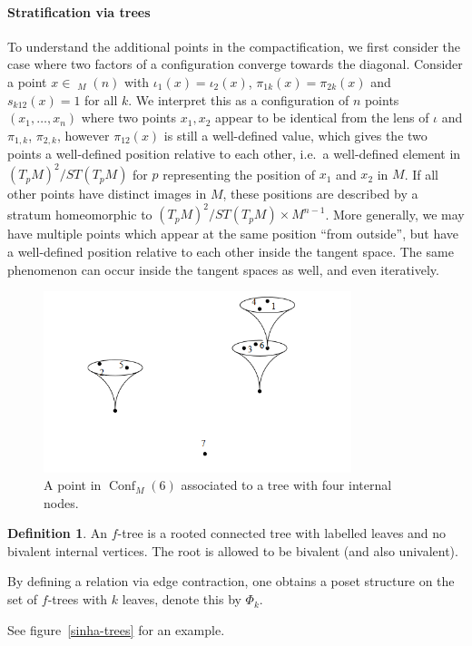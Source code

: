 \documentclass{scrartcl}
\theoremstyle{plain}
\theoremstyle{definition}
\newtheorem{definition}[theorem]{Definition}
\DeclareMathOperator{\Conf}{Conf}
\DeclareMathOperator{\cConf}{\overline{Conf}}
\begin{document}
\paragraph{Stratification via trees} To understand the additional points in the compactification, we first consider the case where two factors of a configuration converge towards the diagonal. Consider a point $x\in \cConf_M(n)$ with $\iota_1(x) = \iota_2(x)$, $\pi_{1k}(x) = \pi_{2k}(x)$ and $s_{k12}(x) = 1$ for all $k$. We interpret this as a configuration of $n$ points $(x_1, \dots, x_n)$ where two points $x_1, x_2$ appear to be identical from the lens of $\iota$ and $\pi_{1,k}$, $\pi_{2,k}$, however $\pi_{12}(x)$ is still a well-defined value, which gives the two points a well-defined position relative to each other, i.e.\ a well-defined element in $(T_{p}M)^2/ST(T_{p}M)$ for $p$ representing the position of $x_1$ and $x_2$ in $M$. If all other points have distinct images in $M$, these positions are described by a stratum homeomorphic to $(T_{p}M)^2/ST(T_{p}M) \times M^{n-1}$. More generally, we may have multiple points which appear at the same position ``from outside'', but have a well-defined position relative to each other inside the tangent space. The same phenomenon can occur inside the tangent spaces as well, and even iteratively. 

\begin{figure}[ht]\label{sinha-fm}
    \centering
    \includegraphics[width=0.8\textwidth]{img/sinha-fm-element}
    \caption{A point in $\Conf_M(6)$ associated to a tree with four internal nodes. }
\end{figure}    

\begin{definition}
    An $f$-tree is a rooted connected tree with labelled leaves and no bivalent internal vertices. The root is allowed to be bivalent (and also univalent).
    
    By defining a relation via edge contraction, one obtains a poset structure on the set of $f$-trees with $k$ leaves, denote this by $\Phi_k$.
\end{definition}
See figure~\ref{sinha-trees} for an example.
\end{document}
